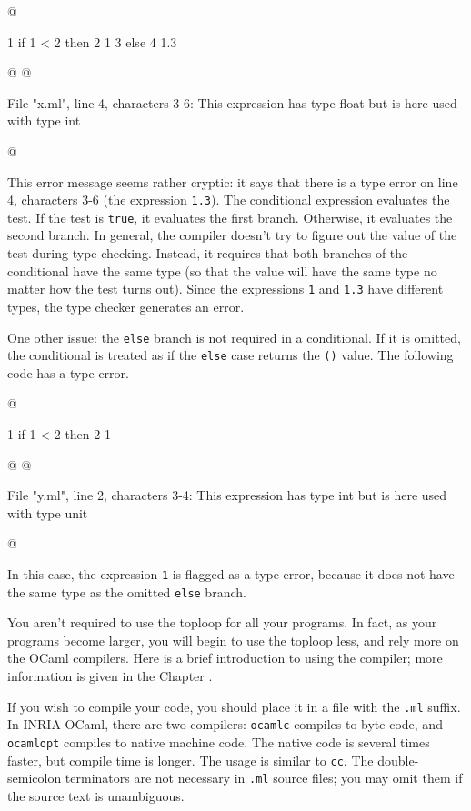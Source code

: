 \begin{ocaml}
@
\begin{topoutput}
    1	if 1 < 2 then
    2	   1
    3	else
    4	   1.3
\end{topoutput}
@
@
\begin{toperror}
File "x.ml", line 4, characters 3-6:
This expression has type float but is here used with type int
\end{toperror}
@
\end{ocaml}
%
This error message seems rather cryptic: it says that there is a type
error on line 4, characters 3-6 (the expression \texttt{1.3}).  The
conditional expression evaluates the test.  If the test is \texttt{true},
it evaluates the first branch.  Otherwise, it evaluates the second branch.
In general, the compiler doesn't try to figure out the value of the
test during type checking.  Instead, it requires that both branches of
the conditional have the same type (so that the value will have the same
type no matter how the test turns out).  Since the expressions \texttt{1}
and \texttt{1.3} have different types, the type checker generates an
error.

One other issue: the \texttt{else} branch is not required in a conditional.
If it is omitted, the conditional is treated as if the \texttt{else} case
returns the \texttt{()} value.  The following code has a type error.

\begin{ocaml}
@
\begin{topoutput}
    1	if 1 < 2 then
    2	   1
\end{topoutput}
@
@
\begin{toperror}
File "y.ml", line 2, characters 3-4:
This expression has type int but is here used with type unit
\end{toperror}
@
\end{ocaml}
%
In this case, the expression \texttt{1} is flagged as a type error,
because it does not have the same type as the omitted \texttt{else}
branch.


You aren't required to use the toploop for all your programs.  In
fact, as your programs become larger, you will begin to use the
toploop less, and rely more on the OCaml compilers.  Here is a brief
introduction to using the compiler; more information is given in the
Chapter .

If you wish to compile your code, you should place it in a file with
the \texttt{.ml} suffix.  In INRIA OCaml, there are two compilers:
\texttt{ocamlc} compiles to byte-code, and \texttt{ocamlopt} compiles to
native machine code.  The native code is several times faster, but
compile time is longer.  The usage is similar to \texttt{cc}.  The
double-semicolon terminators are not necessary in \hbox{\lstinline/.ml/} source
files; you may omit them if the source text is unambiguous.


